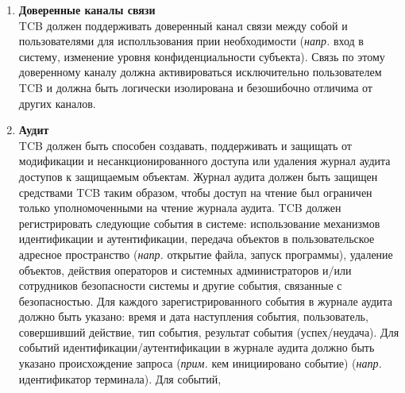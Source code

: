 \begin{enumerate}
\begin{enumerate}
\begin{enumerate}
\begin{enumerate}
                которые включают в себя информацию для проверки личности отдельных пользователей, а также информацию для определения допуска и полномочий отдельных пользователей. Эти данные должны
                использоваться TCB для аутентификации личности пользователя и обеспечения того, что уровень конфиденциальности и полномочия внешних по отношению к TCB субъектов, которые
                могут быть созданы для действий от имени отдельного пользователя, определяются допуском и полномочиями этого пользователя. TCB должен защищать данные аутентификации от
                несанкционированного доступа неавторизованным пользователем. TCB должен обеспечивать подотчетность отдельного пользователя, предоставляя возможность уникальной идентификации отдельного
                пользователя. TCB должен также обеспечивать соответствие пользователя с совершаемыми им действиями, подлежащими аудиту.
                \item{\textbf{Доверенные каналы	связи}}\\
                TCB должен поддерживать доверенный канал связи между собой и пользователями для исполльзования прии необходимости (\textit{напр.} вход в систему, изменение уровня конфиденциальности
                субъекта). Связь по этому доверенному каналу должна активироваться исключительно пользователем TCB и должна быть логически изолирована и безошибочно отличима от других каналов.
                \item{\textbf{Аудит}}\\
                TCB должен быть способен создавать, поддерживать и защищать от модификации и несанкционированного доступа или удаления журнал аудита доступов к защищаемым объектам. Журнал аудита
                должен быть защищен средствами TCB таким образом, чтобы доступ на чтение был ограничен только уполномоченными на чтение журнала аудита. TCB должен регистрировать следующие события
                в системе: использование механизмов идентификации и аутентификации, передача объектов в пользовательское адресное пространство (\textit{напр.} открытие файла, запуск программы),
                удаление объектов, действия операторов и системных администраторов и/или сотрудников безопасности системы и другие события, связанные с безопасностью. Для каждого зарегистрированного
                события в журнале аудита должно быть указано: время и дата наступления события, пользователь, совершивший действие, тип события, результат события (успех/неудача). Для событий
                идентификации/аутентификации в журнале аудита должно быть указано происхождение запроса (\textit{прим.} кем инициировано событие) (\textit{напр.} идентификатор терминала). Для событий,

\end{enumerate}
\end{enumerate}
\end{enumerate}
\end{enumerate}
